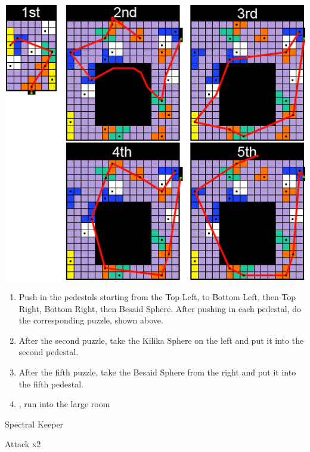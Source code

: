\includegraphics[width=.95\columnwidth]{graphics/Zanarkand_Trials}
\begin{enumerate}[resume]
    \item Push in the pedestals starting from the Top Left, to Bottom Left, then Top Right, Bottom Right, then Besaid Sphere. After pushing in each pedestal, do the corresponding puzzle, shown above.
    \item After the second puzzle, take the Kilika Sphere on the left and put it into the second pedestal.
    \item After the fifth puzzle, take the Besaid Sphere from the right and put it into the fifth pedestal.
    \item \cs, run into the large room
\end{enumerate}
\begin{battle}[52000]{Spectral Keeper}
    \begin{itemize}
        \summon{\bahamut}
        \bahamutf Attack x2
    \end{itemize}
\end{battle}
\bothvfill\winvfill\lossvfill

